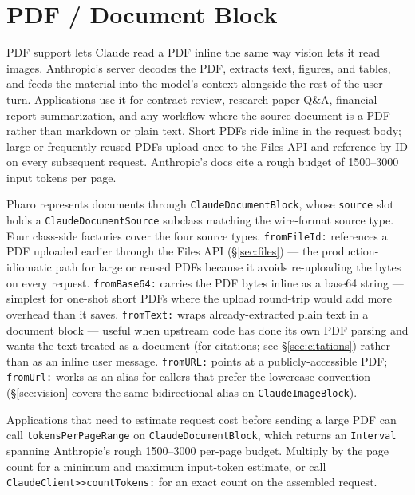 \documentclass[a4paper,10pt,fleqn]{article}
\begin{document}
\medskip
\begin{sloppypar}
\end{sloppypar}

\section{PDF / Document Block}
\label{sec:pdf}

PDF support lets Claude read a PDF inline the same way vision lets
it read images.  Anthropic's server decodes the PDF, extracts
text, figures, and tables, and feeds the material into the model's
context alongside the rest of the user turn.  Applications use it
for contract review, research-paper Q\&A, financial-report
summarization, and any workflow where the source document is a PDF
rather than markdown or plain text.  Short PDFs ride inline in the
request body; large or frequently-reused PDFs upload once to the
Files API and reference by ID on every subsequent request.
Anthropic's docs cite a rough budget of 1500--3000 input tokens per
page.

\begin{sloppypar}
Pharo represents documents through \texttt{ClaudeDocumentBlock},
whose \texttt{source} slot holds a \texttt{ClaudeDocumentSource}
subclass matching the wire-format source type.  Four class-side
factories cover the four source types.  \texttt{fromFileId:}
references a PDF uploaded earlier through the Files API
(\S\ref{sec:files}) --- the production-idiomatic path for large or
reused PDFs because it avoids re-uploading the bytes on every
request.  \texttt{fromBase64:} carries the PDF bytes inline as a
base64 string --- simplest for one-shot short PDFs where the
upload round-trip would add more overhead than it saves.
\texttt{fromText:} wraps already-extracted plain text in a document
block --- useful when upstream code has done its own PDF parsing
and wants the text treated as a document (for citations; see
\S\ref{sec:citations}) rather than as an inline user message.
\texttt{fromURL:} points at a publicly-accessible PDF;
\texttt{fromUrl:} works as an alias for callers that prefer the
lowercase convention (\S\ref{sec:vision} covers the same
bidirectional alias on \texttt{ClaudeImageBlock}).
\end{sloppypar}

\begin{sloppypar}
Applications that need to estimate request cost before sending a
large PDF can call \texttt{tokensPerPageRange} on
\texttt{ClaudeDocumentBlock}, which returns an \texttt{Interval}
spanning Anthropic's rough 1500--3000 per-page budget.  Multiply
by the page count for a minimum and maximum input-token estimate,
or call \texttt{ClaudeClient>>countTokens:} for an exact count on
the assembled request.
\end{sloppypar}
\end{document}
